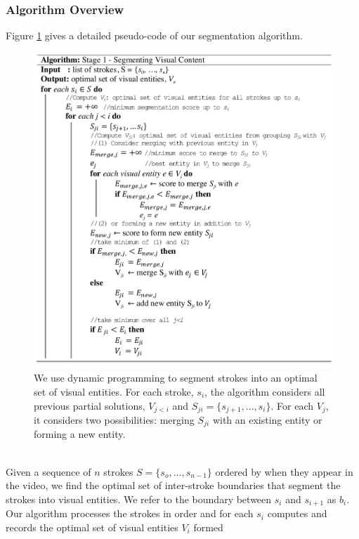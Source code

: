 \subsubsection{Algorithm Overview}
Figure \ref{Fig:pseudocode} gives a detailed pseudo-code of our segmentation algorithm.\\    
%
\begin{figure}[h!]
        \centering
        \includegraphics[width=\textwidth]{figures/pseudocode_image.pdf}
	\captionsetup{font=footnotesize}
        \caption{We use dynamic programming to segment strokes into an optimal
set of visual entities. For each stroke, $s_i$, the algorithm considers all previous
partial solutions, $V_{j<i}$ and $S_{ji}=\{s_{j+1}, ..., s_i\}$. For each
$V_j$, it considers two possibilities: merging $S_{ji}$ with an existing
entity or forming a new entity.}
        \label{Fig:pseudocode}
\end{figure}\\
%
Given a sequence of $n$ strokes $S = \{s_o,\dots,s_{n-1}\}$ ordered by
when they appear in the video, we find the optimal set of inter-stroke
boundaries that segment the strokes into visual entities. We refer to the boundary between $s_i$ and $s_{i+1}$ as
$b_i$.
%
Our algorithm processes the strokes in order and for each $s_i$
computes and records the optimal set of visual entities $V_i$ formed
